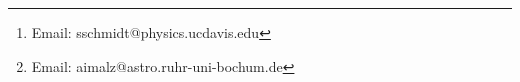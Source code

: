 
\author[LSST Dark Energy Science Collaboration]{
\parbox{\textwidth}{
\Large
S.J.~Schmidt$^{1}$\thanks{Email: sschmidt@physics.ucdavis.edu},
A.I.~Malz$^{2,3,4}$\thanks{Email: aimalz@astro.ruhr-uni-bochum.de},
J.Y.H.~Soo$^{5,6}$,
I.A.~Almosallam$^{7,8}$,
M.~Brescia$^{9}$,
S.~Cavuoti$^{9,10}$,
J.~Cohen-Tanugi$^{11}$,
A.J.~Connolly$^{12}$,
J.~DeRose$^{13,14,15,16,17}$,
P.E.~Freeman$^{18}$,
M.L.~Graham$^{12}$,
K.G.~Iyer$^{19,20}$,
M.J.~Jarvis$^{21,22}$,
J.B.~Kalmbach$^{12}$,
E.~Kovacs$^{23}$,
A.B.~Lee$^{18}$,
G.~Longo$^{10}$,
C.B.~Morrison$^{12}$,
J.A.~Newman$^{24}$,
E.~Nourbakhsh$^{1}$,
E.~Nuss$^{11}$,
T.~Pospisil$^{18}$,
H.~Tranin$^{11}$,
R.H.~Wechsler$^{25,16,26}$,
R.~Zhou$^{15,24}$,
R.~Izbicki$^{27,28}$
\begin{center} (LSST Dark Energy Science Collaboration) \end{center}
}
\vspace{0.4cm}
\\
\parbox{\textwidth}{
(Affiliations are listed at the end of the paper)
\vspace{0.8cm}
}
}
